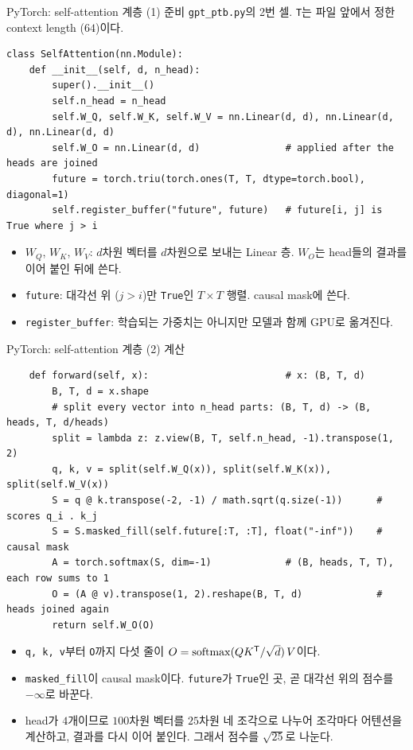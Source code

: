 \documentclass[aspectratio=169,11pt]{beamer}
\begin{document}
\begin{frame}[fragile]{PyTorch: self-attention 계층 (1) 준비}
\texttt{gpt\_ptb.py}의 2번 셀. \texttt{T}는 파일 앞에서 정한 context length ($64$)이다.
\begin{lstlisting}
class SelfAttention(nn.Module):
    def __init__(self, d, n_head):
        super().__init__()
        self.n_head = n_head
        self.W_Q, self.W_K, self.W_V = nn.Linear(d, d), nn.Linear(d, d), nn.Linear(d, d)
        self.W_O = nn.Linear(d, d)               # applied after the heads are joined
        future = torch.triu(torch.ones(T, T, dtype=torch.bool), diagonal=1)
        self.register_buffer("future", future)   # future[i, j] is True where j > i
\end{lstlisting}
\begin{itemize}
\item $W_Q$, $W_K$, $W_V$: $d$차원 벡터를 $d$차원으로 보내는 Linear 층.
  $W_O$는 head들의 결과를 이어 붙인 뒤에 쓴다.
\item \texttt{future}: 대각선 위 ($j>i$)만 \texttt{True}인 $T\times T$ 행렬. causal mask에 쓴다.
\item \texttt{register\_buffer}: 학습되는 가중치는 아니지만 모델과 함께 GPU로 옮겨진다.
\end{itemize}
\end{frame}

\begin{frame}[fragile]{PyTorch: self-attention 계층 (2) 계산}
\begin{lstlisting}
    def forward(self, x):                        # x: (B, T, d)
        B, T, d = x.shape
        # split every vector into n_head parts: (B, T, d) -> (B, heads, T, d/heads)
        split = lambda z: z.view(B, T, self.n_head, -1).transpose(1, 2)
        q, k, v = split(self.W_Q(x)), split(self.W_K(x)), split(self.W_V(x))
        S = q @ k.transpose(-2, -1) / math.sqrt(q.size(-1))      # scores q_i . k_j
        S = S.masked_fill(self.future[:T, :T], float("-inf"))    # causal mask
        A = torch.softmax(S, dim=-1)             # (B, heads, T, T), each row sums to 1
        O = (A @ v).transpose(1, 2).reshape(B, T, d)             # heads joined again
        return self.W_O(O)
\end{lstlisting}
\begin{itemize}
\item \texttt{q, k, v}부터 \texttt{O}까지 다섯 줄이 $O=\operatorname{softmax}(QK^{\mathsf T}/\sqrt d)\,V$이다.
\item \texttt{masked\_fill}이 causal mask이다.
  \texttt{future}가 \texttt{True}인 곳, 곧 대각선 위의 점수를 $-\infty$로 바꾼다.
\item head가 $4$개이므로 $100$차원 벡터를 $25$차원 네 조각으로 나누어 조각마다 어텐션을
  계산하고, 결과를 다시 이어 붙인다. 그래서 점수를 $\sqrt{25}$로 나눈다.
\end{itemize}
\end{frame}
\end{document}
